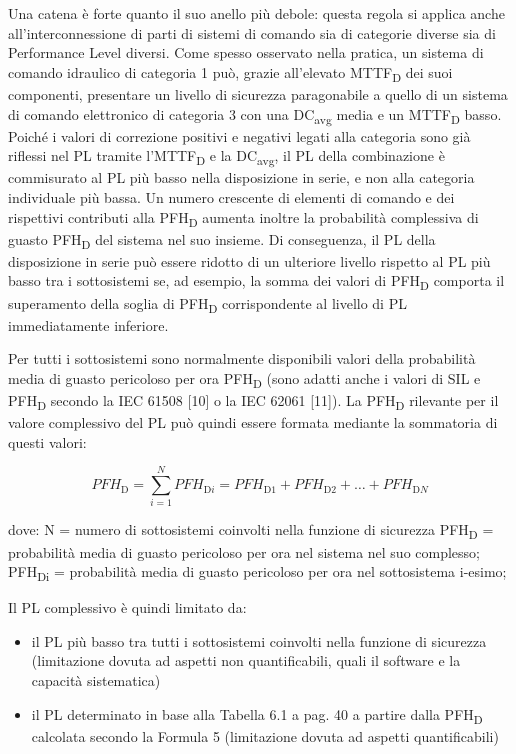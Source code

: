 Una catena è forte quanto il suo anello più debole: questa regola si applica anche all'interconnessione di parti di sistemi di comando sia di categorie diverse sia di Performance Level diversi. Come spesso osservato nella pratica, un sistema di comando idraulico di categoria 1 può, grazie all'elevato MTTF\textsubscript{D} dei suoi componenti, presentare un livello di sicurezza paragonabile a quello di un sistema di comando elettronico di categoria 3 con una DC\textsubscript{avg} media e un MTTF\textsubscript{D} basso. Poiché i valori di correzione positivi e negativi legati alla categoria sono già riflessi nel PL tramite l'MTTF\textsubscript{D} e la DC\textsubscript{avg}, il PL della combinazione è commisurato al PL più basso nella disposizione in serie, e non alla categoria individuale più bassa. Un numero crescente di elementi di comando e dei rispettivi contributi alla PFH\textsubscript{D} aumenta inoltre la probabilità complessiva di guasto PFH\textsubscript{D} del sistema nel suo insieme. Di conseguenza, il PL della disposizione in serie può essere ridotto di un ulteriore livello rispetto al PL più basso tra i sottosistemi se, ad esempio, la somma dei valori di PFH\textsubscript{D} comporta il superamento della soglia di PFH\textsubscript{D} corrispondente al livello di PL immediatamente inferiore.

Per tutti i sottosistemi sono normalmente disponibili valori della probabilità media di guasto pericoloso per ora PFH\textsubscript{D} (sono adatti anche i valori di SIL e PFH\textsubscript{D} secondo la IEC 61508 [10] o la IEC 62061 [11]). La PFH\textsubscript{D} rilevante per il valore complessivo del PL può quindi essere formata mediante la sommatoria di questi valori:

\begin{equation}
    \textit{PFH}_{\mathrm{D}} = \sum_{i=1}^{N} \textit{PFH}_{\mathrm{D}i}
    = \textit{PFH}_{\mathrm{D1}} + \textit{PFH}_{\mathrm{D2}} + \ldots + \textit{PFH}_{\mathrm{D}N}
    \label{eq:06-05}
\end{equation}

dove:
N = numero di sottosistemi coinvolti nella funzione di sicurezza
PFH\textsubscript{D} = probabilità media di guasto pericoloso per ora nel sistema nel suo complesso;
PFH\textsubscript{Di} = probabilità media di guasto pericoloso per ora nel sottosistema i-esimo;

Il PL complessivo è quindi limitato da:
\begin{itemize}
    \item il PL più basso tra tutti i sottosistemi coinvolti nella funzione di sicurezza (limitazione dovuta ad aspetti non quantificabili, quali il software e la capacità sistematica)
    \item il PL determinato in base alla Tabella 6.1 a pag. 40 a partire dalla PFH\textsubscript{D} calcolata secondo la Formula 5 (limitazione dovuta ad aspetti quantificabili)
\end{itemize}

